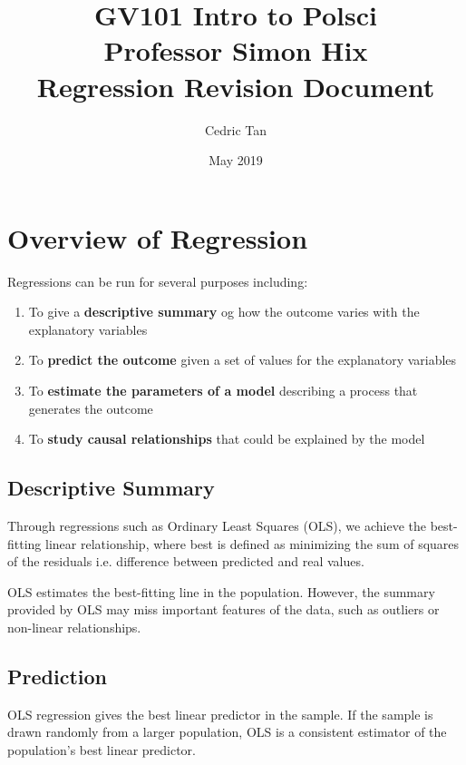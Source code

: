 \documentclass[12pt, letterpaper]{article}
\title{
	{GV101 Intro to Polsci}\\
	{\large{Professor Simon Hix}}\\
	{\large{Regression Revision Document}}
}
\author{Cedric Tan}
\date{May 2019}
\begin{document}
\maketitle
{}

\newpage
\tableofcontents
\newpage

\section{Overview of Regression}
Regressions can be run for several purposes including:
\begin{enumerate}
	\item To give a \textbf{descriptive summary} og how the outcome varies with the explanatory variables
	\item To \textbf{predict the outcome} given a set of values for the explanatory variables
	\item To \textbf{estimate the parameters of a model} describing a process that generates the outcome
	\item To \textbf{study causal relationships} that could be explained by the model
\end{enumerate}

\subsection{Descriptive Summary}
Through regressions such as Ordinary Least Squares (OLS), we achieve the best-fitting linear relationship, where best is defined as minimizing the sum of squares of the residuals i.e. difference between predicted and real values.

OLS estimates the best-fitting line in the population. However, the summary provided by OLS may miss important features of the data, such as outliers or non-linear relationships.

\subsection{Prediction}
OLS regression gives the best linear predictor in the sample. If the sample is drawn randomly from a larger population, OLS is a consistent estimator of the population's best linear predictor.
\end{document}
